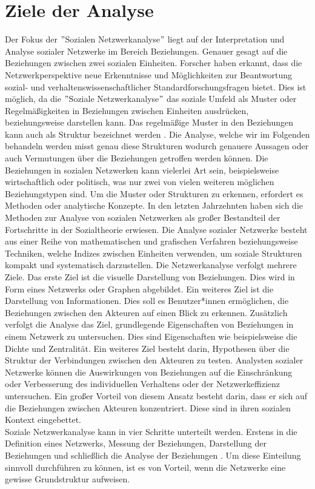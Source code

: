 \section{Ziele der Analyse}
Der Fokus der $"$Sozialen Netzwerkanalyse$"$ liegt auf der Interpretation und Analyse sozialer Netzwerke im Bereich Beziehungen. Genauer gesagt auf die Beziehungen zwischen zwei sozialen Einheiten. Forscher haben erkannt, dass die Netzwerkperspektive neue Erkenntnisse und Möglichkeiten zur Beantwortung sozial- und verhaltenswissenschaftlicher Standardforschungsfragen bietet. Dies ist möglich, da die $"$Soziale Netzwerkanalyse$"$ das soziale Umfeld als Muster oder Regelmäßigkeiten in Beziehungen zwischen Einheiten ausdrücken, beziehungsweise darstellen kann. Das regelmäßige Muster in den Beziehungen kann auch als Struktur bezeichnet werden \cite{wasserman1994social}. Die Analyse, welche wir im Folgenden behandeln werden misst genau diese Strukturen wodurch genauere Aussagen oder auch Vermutungen über die Beziehungen getroffen werden können. Die Beziehungen in sozialen Netzwerken kann vielerlei Art sein, beispielsweise wirtschaftlich oder politisch, was nur zwei von vielen weiteren möglichen Beziehungstypen sind. Um die Muster oder Strukturen zu erkennen, erfordert es Methoden oder analytische Konzepte. In den letzten Jahrzehnten haben sich die Methoden zur Analyse von sozialen Netzwerken als großer Bestandteil der Fortschritte in der Sozialtheorie erwiesen.
Die Analyse sozialer Netzwerke besteht aus einer Reihe von mathematischen und grafischen Verfahren beziehungsweise Techniken, welche Indizes zwischen Einheiten verwenden, um soziale Strukturen kompakt und systematisch darzustellen.
Die Netzwerkanalyse verfolgt mehrere Ziele. Das erste Ziel ist die visuelle Darstellung von Beziehungen. Dies wird in Form eines Netzwerks oder Graphen abgebildet. Ein weiteres Ziel ist die Darstellung von Informationen. Dies soll es Benutzer*innen ermöglichen, die Beziehungen zwischen den Akteuren auf einen Blick zu erkennen. Zusätzlich verfolgt die Analyse das Ziel, grundlegende Eigenschaften von Beziehungen in einem Netzwerk zu untersuchen. Dies sind Eigenschaften wie beispielsweise die Dichte und Zentralität. Ein weiteres Ziel besteht darin, Hypothesen über die Struktur der Verbindungen zwischen den Akteuren zu testen. Analysten sozialer Netzwerke können die Auswirkungen von Beziehungen auf die Einschränkung oder Verbesserung des individuellen Verhaltens oder der Netzwerkeffizienz untersuchen. Ein großer Vorteil von diesem Ansatz besteht darin, dass er sich auf die Beziehungen zwischen Akteuren konzentriert. Diese sind in ihren sozialen Kontext eingebettet.\\
Soziale Netzwerkanalyse kann in vier Schritte unterteilt werden. Erstens in die Definition eines Netzwerks, Messung der Beziehungen, Darstellung der Beziehungen und schließlich die Analyse der Beziehungen \cite{wasserman1994social}. Um diese Einteilung sinnvoll durchführen zu können, ist es von Vorteil, wenn die Netzwerke eine gewisse Grundstruktur aufweisen.

